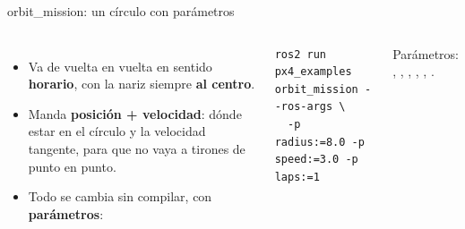 \begin{frame}[fragile]{orbit\_mission: un círculo con parámetros}
  \begin{columns}[c]
    \centering
    \small
    \begin{itemize}
      \item Va de vuelta en vuelta en sentido \textbf{horario}, con la nariz siempre \textbf{al centro}.
      \item Manda \textbf{posición + velocidad}: dónde estar en el círculo y la velocidad tangente, para que
        no vaya a tirones de punto en punto.
      \item Todo se cambia sin compilar, con \textbf{parámetros}:
    \end{itemize}
    \begin{lstlisting}[style=bash]
ros2 run px4_examples orbit_mission --ros-args \
  -p radius:=8.0 -p speed:=3.0 -p laps:=1
    \end{lstlisting}
    \scriptsize Parámetros: , , , , ,
    \cmd{laps}.
  \end{columns}
\end{frame}

